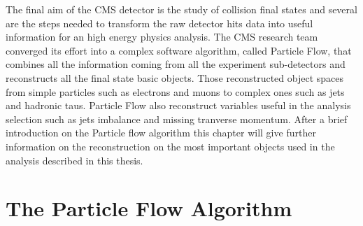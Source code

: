 
	
	


	
	
	


The final aim of the CMS detector is the study of collision final states and several are the steps needed to transform the raw detector hits data into useful information for an high energy physics analysis. The CMS research team converged its effort into a complex software algorithm, called Particle Flow, that combines all the information coming from all the experiment sub-detectors and reconstructs all the final state basic objects. Those reconstructed object spaces from simple particles such as electrons and muons to complex ones such as jets and hadronic taus. Particle Flow also reconstruct variables useful in the analysis selection such as jets imbalance and missing tranverse momentum. After a brief introduction on the Particle flow algorithm this chapter will give further information on the reconstruction on the most important objects used in the analysis described in this thesis.

\section{The Particle Flow Algorithm}

